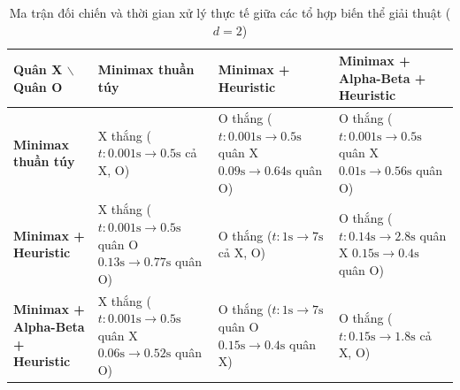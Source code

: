 \begin{table}[!htbp]
	\centering
	\renewcommand{\arraystretch}{1.25}
	\small
	\caption{Ma trận đối chiến và thời gian xử lý thực tế giữa các tổ hợp biến thể giải thuật ($d=2$)}
	\label{tab:ai_vs_ai_variants}
	\begin{tabular}{|m{3.5cm}|m{3.0cm}|m{3.3cm}|m{4.2cm}|}
		\hline
		\textbf{Quân X $\backslash$ Quân O} & \textbf{Minimax thuần túy} & \textbf{Minimax + Heuristic} & \textbf{Minimax + Alpha-Beta + Heuristic} \\ \hline
		\textbf{Minimax thuần túy} & X thắng \newline ($t: 0.001\text{s} \to 0.5\text{s}$ cả X, O) & O thắng \newline ($t: 0.001\text{s} \to 0.5\text{s}$ quân X \newline $0.09\text{s} \to 0.64\text{s}$ quân O) & O thắng \newline ($t: 0.001\text{s} \to 0.5\text{s}$ quân X \newline $0.01\text{s} \to 0.56\text{s}$ quân O) \\ \hline
		\textbf{Minimax + Heuristic} & X thắng \newline ($t: 0.001\text{s} \to 0.5\text{s}$ quân O \newline $0.13\text{s} \to 0.77\text{s}$ quân O) & O thắng \newline ($t: 1\text{s} \to 7\text{s}$ cả X, O) & O thắng \newline ($t: 0.14\text{s} \to 2.8\text{s}$ quân X \newline $0.15\text{s} \to 0.4\text{s}$ quân O) \\ \hline
		\textbf{Minimax + Alpha-Beta + Heuristic} & X thắng \newline ($t: 0.001\text{s} \to 0.5\text{s}$ quân X \newline $0.06\text{s} \to 0.52\text{s}$ quân O) & O thắng \newline ($t: 1\text{s} \to 7\text{s}$ quân O \newline $0.15\text{s} \to 0.4\text{s}$ quân X) & O thắng \newline ($t: 0.15\text{s} \to 1.8\text{s}$ cả X, O) \\ \hline
	\end{tabular}
\end{table}

